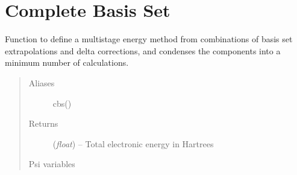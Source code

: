 \documentclass[letterpaper,10pt,english]{sphinxmanual}
\begin{document}
\chapter{Complete Basis Set}
\label{index:complete-basis-set}

\begin{fulllineitems}
\label{index:wrappers.complete_basis_set}
Function to define a multistage energy method from combinations of
basis set extrapolations and delta corrections, and condenses the
components into a minimum number of calculations.
\begin{quote}\begin{description}
\item[{Aliases }] \leavevmode
cbs()

\item[{Returns}] \leavevmode
(\emph{float}) -- Total electronic energy in Hartrees

\item[{Psi variables}] \leavevmode
\end{description}\end{quote}

\begin{fulllineitems}
\label{index:envvar-CBSTOTALENERGY}\label{index:envvar-CBSREFERENCEENERGY}\label{index:envvar-CBSCORRELATIONENERGY}\label{index:envvar-CURRENTENERGY}\label{index:envvar-CURRENTREFERENCEENERGY}\label{index:envvar-CURRENTCORRELATIONENERGY}
\end{fulllineitems}



\end{fulllineitems}
\end{document}
